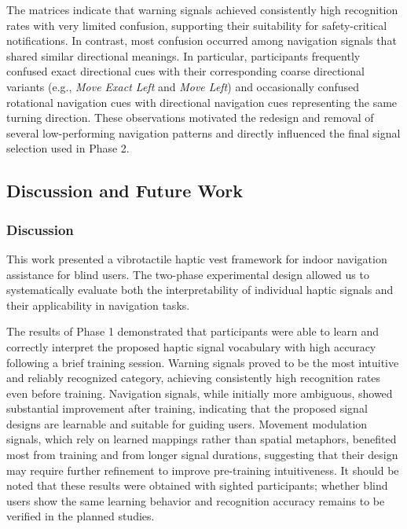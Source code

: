 \documentclass[12pt]{report}
\begin{document}
The matrices indicate that warning signals achieved consistently high recognition rates with very limited confusion, supporting their suitability for safety-critical notifications. In contrast, most confusion occurred among navigation signals that shared similar directional meanings. In particular, participants frequently confused exact directional cues with their corresponding coarse directional variants (e.g., \textit{Move Exact Left} and \textit{Move Left}) and occasionally confused rotational navigation cues with directional navigation cues representing the same turning direction. These observations motivated the redesign and removal of several low-performing navigation patterns and directly influenced the final signal selection used in Phase 2.

\subsection{Discussion and Future Work}

\subsubsection{Discussion}

This work presented a vibrotactile haptic vest framework for indoor navigation assistance for blind users. The two-phase experimental design allowed us to systematically evaluate both the interpretability of individual haptic signals and their applicability in navigation tasks.

The results of Phase 1 demonstrated that participants were able to learn and correctly interpret the proposed haptic signal vocabulary with high accuracy following a brief training session. Warning signals proved to be the most intuitive and reliably recognized category, achieving consistently high recognition rates even before training. Navigation signals, while initially more ambiguous, showed substantial improvement after training, indicating that the proposed signal designs are learnable and suitable for guiding users. Movement modulation signals, which rely on learned mappings rather than spatial metaphors, benefited most from training and from longer signal durations, suggesting that their design may require further refinement to improve pre-training intuitiveness. It should be noted that these results were obtained with sighted participants; whether blind users show the same learning behavior and recognition accuracy remains to be verified in the planned studies.
\end{document}

